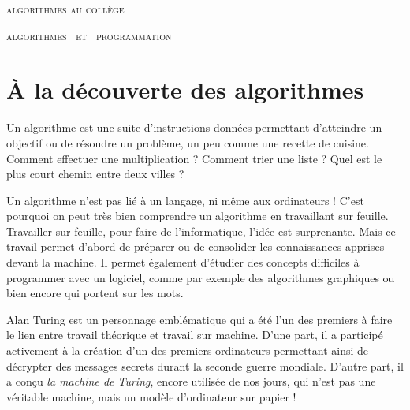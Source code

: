 
\pagestyle{empty}\thispagestyle{empty}
\vspace*{\fill}
\begin{center}
\fontsize{52}{52}\selectfont
\textsc{algorithmes au collège}

  \hfil
  
\end{center}
\vfill
\begin{center}
\huge
\textsc{algorithmes \  et \  programmation}
\end{center}
\begin{center}
\end{center}
\clearpage

\thispagestyle{empty}

\vspace*{\fill}
\section*{À la découverte des algorithmes}

Un algorithme est une suite d'instructions données permettant d'atteindre un objectif ou de résoudre un problème, un peu comme une recette de cuisine. Comment effectuer une multiplication ? Comment trier une liste ? Quel est le plus court chemin entre deux villes ?

\bigskip

Un algorithme n'est pas lié à un langage, ni même aux ordinateurs ! C'est pourquoi on peut très bien comprendre un algorithme en travaillant sur feuille. Travailler sur feuille, pour faire de l'informatique, l'idée est surprenante. Mais ce travail permet d'abord de préparer ou de consolider les connaissances apprises devant la machine. Il permet également d'étudier des concepts difficiles à programmer avec un logiciel, comme par exemple des algorithmes graphiques ou bien encore qui portent sur les mots. 

\bigskip

Alan Turing est un personnage emblématique qui a été l'un des premiers à faire le lien entre travail théorique et travail sur machine. D'une part, il a participé activement à la création d'un des premiers ordinateurs permettant ainsi de décrypter des messages secrets durant la seconde guerre mondiale. D'autre part, il a conçu \emph{la machine de Turing}, encore utilisée de nos jours, qui n'est pas une véritable machine, mais un modèle d'ordinateur sur papier ! 

\vspace*{\fill}

\thispagestyle{empty}
\tableofcontents

